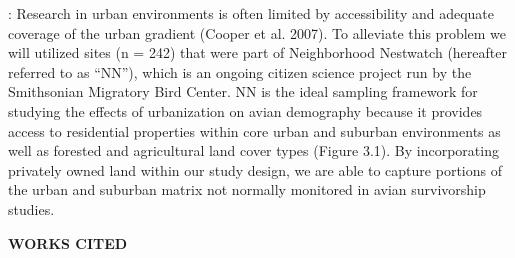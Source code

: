 \documentclass[12pt]{article}
\begin{document}

:
Research in urban environments is often limited by accessibility and adequate coverage of the urban gradient (Cooper et al. 2007). To alleviate this problem we will utilized sites (n = 242) that were part of Neighborhood Nestwatch (hereafter referred to as “NN”), which is an ongoing citizen science project run by the Smithsonian Migratory Bird Center. NN is the ideal sampling framework for studying the effects of urbanization on avian demography because it provides access to residential properties within core urban and suburban environments as well as forested and agricultural land cover types (Figure 3.1). By incorporating privately owned land within our study design, we are able to capture portions of the urban and suburban matrix not normally monitored in avian survivorship studies.

\noindent \begin{center} {\textbf {WORKS CITED}}\end{center} \par
\end{document}
